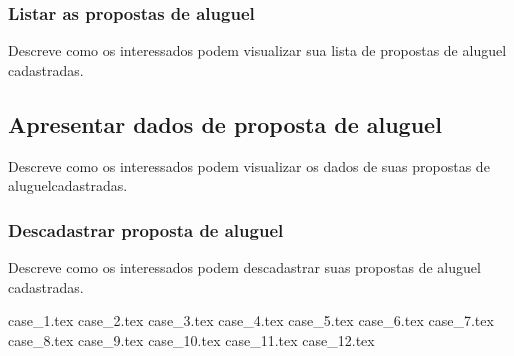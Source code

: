 \subsubsection*{Listar as propostas de aluguel}

Descreve como os interessados podem visualizar sua lista de propostas de aluguel cadastradas.

\subsection*{Apresentar dados de proposta de aluguel}

Descreve como os interessados podem visualizar os dados de suas propostas de aluguelcadastradas.

\subsubsection*{Descadastrar proposta de aluguel} 

Descreve como os interessados podem descadastrar suas propostas de aluguel cadastradas.

{case_1.tex}
{case_2.tex}
{case_3.tex}
{case_4.tex}
{case_5.tex}
{case_6.tex}
{case_7.tex}
{case_8.tex}
{case_9.tex}
{case_10.tex}
{case_11.tex}
{case_12.tex}